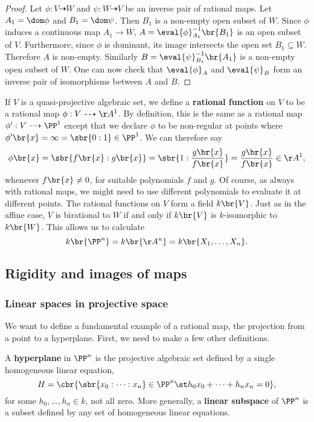 \begin{proof}
Let $ \phi : V \dashrightarrow W $ and $ \psi : W \dashrightarrow V $ be an inverse pair of rational maps. Let $ A_1 = \dom \phi $ and $ B_1 = \dom \psi $. Then $ B_1 $ is a non-empty open subset of $ W $. Since $ \phi $ induces a continuous map $ A_1 \to W $, $ A = \eval{\phi}_{A_1}^{-1}\br{B_1} $ is an open subset of $ V $. Furthermore, since $ \phi $ is dominant, its image intersects the open set $ B_1 \subseteq W $. Therefore $ A $ is non-empty. Similarly $ B = \eval{\psi}_{B_1}^{-1}\br{A_1} $ is a non-empty open subset of $ W $. One can now check that $ \eval{\phi}_A $ and $ \eval{\psi}_B $ form an inverse pair of isomorphisms between $ A $ and $ B $.
\end{proof}

If $ V $ is a quasi-projective algebraic set, we define a \textbf{rational function} on $ V $ to be a rational map $ \phi : V \dashrightarrow \AA^1 $. By definition, this is the same as a rational map $ \phi' : V \dashrightarrow \PP^1 $ except that we declare $ \phi $ to be non-regular at points where $ \phi'\br{x} = \infty = \sbr{0 : 1} \in \PP^1 $. We can therefore say
$$ \phi\br{x} = \sbr{f\br{x} : g\br{x}} = \sbr{1 : \dfrac{g\br{x}}{f\br{x}}} = \dfrac{g\br{x}}{f\br{x}} \in \AA^1, $$
whenever $ f\br{x} \ne 0 $, for suitable polynomials $ f $ and $ g $. Of course, as always with rational maps, we might need to use different polynomials to evaluate it at different points. The rational functions on $ V $ form a field $ k\br{V} $. Just as in the affine case, $ V $ is birational to $ W $ if and only if $ k\br{V} $ is $ k $-isomorphic to $ k\br{W} $. This allows us to calculate
$$ k\br{\PP^n} = k\br{\AA^n} = k\br{X_1, \dots, X_n}. $$

\pagebreak

\subsection{Rigidity and images of maps}

\subsubsection{Linear spaces in projective space}

We want to define a fundamental example of a rational map, the projection from a point to a hyperplane. First, we need to make a few other definitions.

\begin{definition*}
A \textbf{hyperplane} in $ \PP^n $ is the projective algebraic set defined by a single homogeneous linear equation,
$$ H = \cbr{\sbr{x_0 : \dots : x_n} \in \PP^n \st h_0x_0 + \dots + h_nx_n = 0}, $$
for some $ h_0, \dots, h_n \in k $, not all zero. More generally, a \textbf{linear subspace} of $ \PP^n $ is a subset defined by any set of homogeneous linear equations.
\end{definition*}

